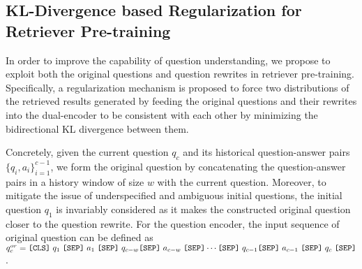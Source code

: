 \subsection{KL-Divergence based Regularization for Retriever Pre-training}\label{sec:kl}
In order to improve the capability of question understanding, we propose to exploit both the original questions and question rewrites in retriever pre-training. Specifically, a regularization mechanism is proposed to force two distributions of the retrieved results generated by feeding the original questions and their rewrites into the dual-encoder to be consistent with each other by minimizing the bidirectional KL divergence between them.

Concretely, given the current question $q_c$ and its historical question-answer pairs $\{q_i, a_i\}_{i=1}^{c-1}$, we form the original question by concatenating the question-answer pairs in a history window of size $w$ with the current question. Moreover, to mitigate the issue of underspecified and ambiguous initial questions, the initial question $q_1$ is invariably considered as it makes the constructed original question closer to the question rewrite. For the question encoder, the input sequence of original question can be defined as 
$q_c^{or} = \verb|[CLS]|\;q_1 \;\verb|[SEP]|\;a_1    \;\verb|[SEP]|\;q_{c-w}\verb|[SEP]|\;a_{c-w}\;\verb|[SEP]| \cdots \verb|[SEP]|\;q_{c-1}\\
\verb|[SEP]|\;a_{c-1}\;\verb|[SEP]|\;q_c\;\verb|[SEP]|$.

